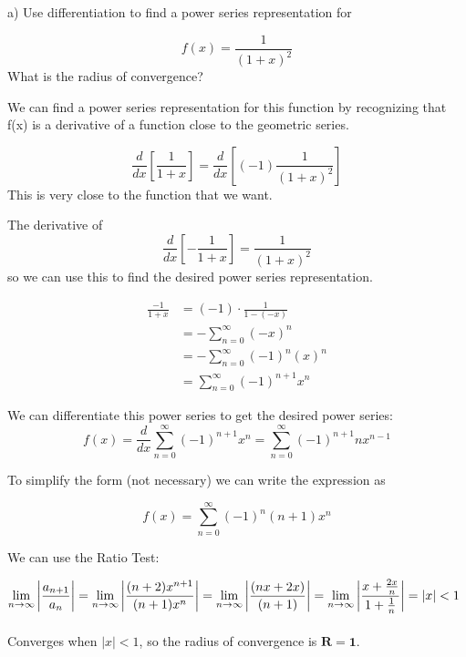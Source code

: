 \documentclass[12pt]{article}
\newcommand{\inftylim}[1]{\mathlarger{\lim_{n \to \infty}#1}}
\begin{document}
\begin{solution}
a) Use differentiation to find a power series representation for

$$f(x) = \frac{1}{(1 + x)^{2}} $$
What is the radius of convergence? 


We can find a power series representation for this function by recognizing that f(x) is a derivative of a function close to the geometric series.

$$\frac{d}{dx}\left[ \frac{1}{1 + x} \right] = \frac{d}{dx}\left[ (-1)\frac{1}{(1 + x)^{2}} \right]$$ This is very close to the function that we want.

The derivative of  $$\frac{d}{dx}\left[ -\frac{1}{1 + x} \right] = \frac{1}{(1 + x)^2}$$
so we can use this to find the desired power series representation.

\begin{align*} 
\frac{-1}{1 + x} &= (-1) \cdot \frac{1}{1 - (-x)} \\
	&= - \sum^{\infty}_{n = 0} (-x)^{n} \\ 	&= - \sum^{\infty}_{n = 0} (-1)^n(x)^{n} \\
	&= \sum^{\infty}_{n = 0} (-1)^{n + 1}x^{n}
\end{align*} 

We can differentiate this power series to get the desired power series: 
$$f(x) = \frac{d}{dx} \sum^{\infty}_{n = 0} (-1)^{n + 1}x^{n} = \sum^{\infty}_{n = 0} (-1)^{n + 1}nx^{n - 1}$$ 

To simplify the form (not necessary) we can write the expression as 

$$f(x) = \sum^{\infty}_{n = 0} (-1)^{n} (n + 1)x^{n}$$ 

We can use the Ratio Test:

$\inftylim{\left|\frac{a_{n + 1}}{a_n} \right|} = \inftylim{\left|\frac{(n + 2)x^{n+ 1}}{(n + 1)x^{n}} \right|} = \inftylim{\left|\frac{(nx + 2x)}{(n + 1)} \right|} = \inftylim{\left|\frac{x + \frac{2x}{n}}{1 + \frac{1}{n}} \right|} = \left|x\right| < 1$ ~\\

Converges when $\left|x\right| < 1$, so the radius of convergence is $\mathbf{R = 1}$.
\end{solution} 
\end{document}

